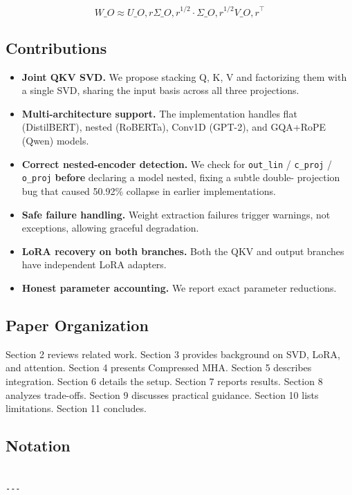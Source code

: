 \[
W\_O \approx U\_{O, r} \Sigma\_{O, r}^{1/2} \cdot \Sigma\_{O, r}^{1/2} V\_{O, r}^\top
\]

\subsection{Contributions}

\begin{itemize}
\item \textbf{Joint QKV SVD.} We propose stacking Q, K, V and factorizing them with a
  single SVD, sharing the input basis across all three projections.
\item \textbf{Multi-architecture support.} The implementation handles flat (DistilBERT),
  nested (RoBERTa), Conv1D (GPT-2), and GQA+RoPE (Qwen) models.
\item \textbf{Correct nested-encoder detection.} We check for \texttt{out\_lin} / \texttt{c\_proj} /
  \texttt{o\_proj} \textbf{before} declaring a model nested, fixing a subtle double-
  projection bug that caused 50.92\% collapse in earlier implementations.
\item \textbf{Safe failure handling.} Weight extraction failures trigger warnings, not
  exceptions, allowing graceful degradation.
\item \textbf{LoRA recovery on both branches.} Both the QKV and output branches have
  independent LoRA adapters.
\item \textbf{Honest parameter accounting.} We report exact parameter reductions.

\end{itemize}
\subsection{Paper Organization}

Section 2 reviews related work. Section 3 provides background on SVD, LoRA, 
and attention. Section 4 presents Compressed MHA. Section 5 describes 
integration. Section 6 details the setup. Section 7 reports results. Section 8 
analyzes trade-offs. Section 9 discusses practical guidance. Section 10 lists 
limitations. Section 11 concludes.



\subsection{Notation}

\begin{lstlisting}

---
\end{lstlisting}

